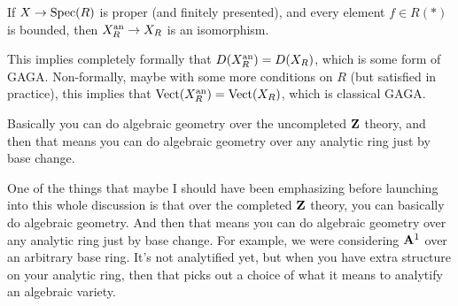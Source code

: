 \begin{theorem}[\yt{1h18m18s}{GAGA}]
  If $X\to\operatorname{Spec}(R)$ is proper (and finitely presented), and every element $f\in R(*)$ is bounded, then $X_R^{\mathrm{an}} \to X_R$ is an isomorphism.

\end{theorem}

\begin{remark}
  This implies completely formally that $D(X^{\mathrm{an}}_R)=D(X_R)$, which is some form of GAGA. Non-formally, maybe with some more conditions on $R$ (but satisfied in practice), this implies that $\text{Vect}(X^{\mathrm{an}}_R)=\text{Vect}(X_R)$, which is classical GAGA. 

  Basically you can do algebraic geometry over the uncompleted $\mathbf Z$ theory, and then that means you can do algebraic geometry over any analytic ring just by base change.
\end{remark}

One of the things that maybe I should have been emphasizing before launching into this whole discussion is that over the completed $\mathbf Z$ theory, you can basically do algebraic geometry. And then that means you can do algebraic geometry over any analytic ring just by base change. For example, we were considering $\mathbf A^1$ over an arbitrary base ring. It's not analytified yet, but when you have extra structure on your analytic ring, then that picks out a choice of what it means to analytify an algebraic variety.

